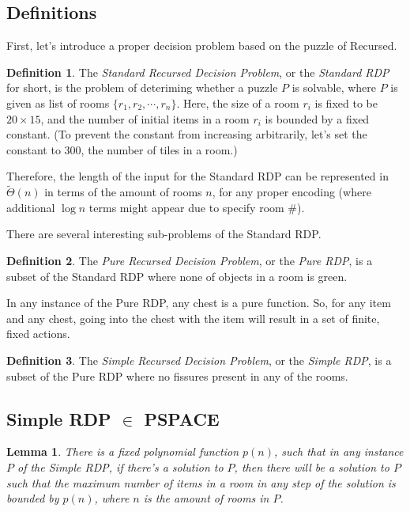 \documentclass[a4paper]{article}
\newtheorem{lemma}{Lemma}[section]
\theoremstyle{definition}
\newtheorem{definition}{Definition}[section]
\begin{document}
\subsection{Definitions}
First, let's introduce a proper decision problem based on the puzzle of Recursed.
\begin{definition}
The \emph{Standard Recursed Decision Problem}, or the \emph{Standard RDP} for short, is the problem of deteriming
whether a puzzle $P$ is solvable, where $P$ is given as list of rooms $\{r_1, r_2, \cdots, r_n\}$.
Here, the size of a room $r_i$ is fixed to be $20 \times 15$, and the number of initial items in a room $r_i$ is bounded by
a fixed constant. (To prevent the constant from increasing arbitrarily, let's set the constant to $300$, the number of tiles in a room.)
\end{definition}
Therefore, the length of the input for the Standard RDP can be represented in $\tilde{\Theta}(n)$ in terms of the amount
of rooms $n$, for any proper encoding (where additional $\log n$ terms might appear due to specify room \#).

There are several interesting sub-problems of the Standard RDP.
\begin{definition}
The \emph{Pure Recursed Decision Problem}, or the \emph{Pure RDP}, is a subset of the Standard RDP where none of objects in a room is green.
\end{definition}
In any instance of the Pure RDP, any chest is a pure function. So, for any item and any chest, going into the chest with the item will result in a set of finite, fixed actions.

\begin{definition}
The \emph{Simple Recursed Decision Problem}, or the \emph{Simple RDP}, is a subset of the Pure RDP where no fissures present in any of the rooms.
\end{definition}

\subsection{Simple RDP $\in$ PSPACE}
\begin{lemma}
There is a fixed polynomial function $p(n)$, such that in any instance $P$ of the Simple RDP, if there's a solution to $P$,
then there will be a solution to $P$ such that the maximum number of items in a room in any step of the solution is bounded by $p(n)$,
where $n$ is the amount of rooms in $P$.
\end{lemma}
\end{document}
